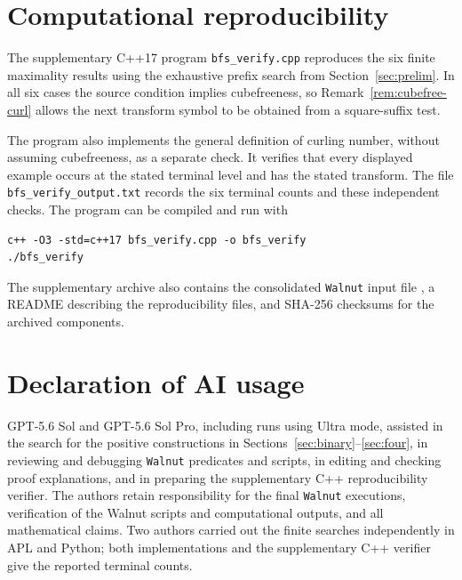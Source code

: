 \documentclass[12pt,reqno]{article}
\begin{document}
\section{Computational reproducibility}
\label{sec:repro}

The supplementary C++17 program {\tt bfs\_verify.cpp} reproduces the six finite maximality results using the exhaustive prefix search from Section~\ref{sec:prelim}.  In all six cases the source condition implies cubefreeness, so Remark~\ref{rem:cubefree-curl} allows the next transform symbol to be obtained from a square-suffix test.

The program also implements the general definition of curling number, without assuming cubefreeness, as a separate check.  It verifies that every displayed example occurs at the stated terminal level and has the stated transform.  The file {\tt bfs\_verify\_output.txt} records the six terminal counts and these independent checks.  The program can be compiled and run with
\begin{verbatim}
c++ -O3 -std=c++17 bfs_verify.cpp -o bfs_verify
./bfs_verify
\end{verbatim}
The supplementary archive also contains the consolidated {\tt Walnut} input file , a README describing the reproducibility files, and SHA-256 checksums for the archived components.


\section*{Declaration of AI usage}

GPT-5.6 Sol and GPT-5.6 Sol Pro, including runs using Ultra mode, assisted in the search for the positive constructions in Sections~\ref{sec:binary}--\ref{sec:four}, in reviewing and debugging {\tt Walnut} predicates and scripts, in editing and checking proof explanations, and in preparing the supplementary C++ reproducibility verifier.  The authors retain responsibility for the final {\tt Walnut} executions, verification of the Walnut scripts and computational outputs, and all mathematical claims.  Two authors carried out the finite searches independently in APL and Python; both implementations and the supplementary C++ verifier give the reported terminal counts.
\end{document}
